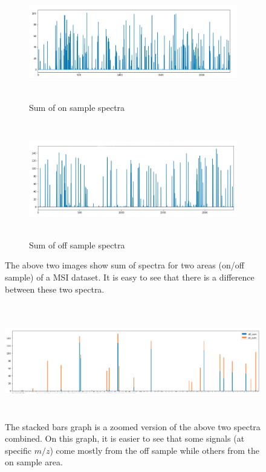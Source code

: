 \documentclass[a4paper]{article}
\begin{document}
\begin{figure}[H]
    \begin{subfigure}[b]{\textwidth}
        \centering
        \includegraphics[width=\textwidth,height=5cm,keepaspectratio]{sum_ints_on_sample_graph.png}
        \caption{Sum of on sample spectra}
        \label{fig:sum_ints_on_sample_graph.png}
    \end{subfigure}
    \begin{subfigure}[b]{\textwidth}
        \centering
        \includegraphics[width=\textwidth,height=5cm,keepaspectratio]{sum_ints_off_sample_graph.png}
        \caption{Sum of off sample spectra}
        \label{fig:sum_ints_off_sample_graph.png}
    \end{subfigure}
    \caption{The above two images show sum of spectra for two areas (on/off sample) of a MSI dataset.
    It is easy to see that there is a difference between these two spectra.}
\end{figure}

\begin{figure}[H]
    \centering
        \includegraphics[width=\textwidth,height=5cm]{sum_int_stacked_bar.png}
    \caption{The stacked bars graph is a zoomed version of the above two spectra combined.
    On this graph, it is easier to see that some signals (at specific $m/z$) come mostly from
    the off sample while others from the on sample area.}
\end{figure}
\end{document}
